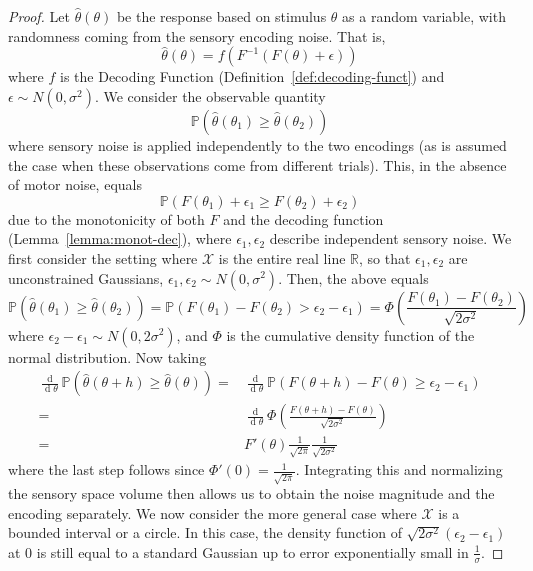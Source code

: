 \begin{proof}
    Let $\widehat{\theta}(\theta)$ be the response based on stimulus $\theta$ as a random variable, with randomness coming from the sensory encoding noise.
    That is,
    \begin{equation}
        \widehat{\theta}(\theta) = f(F^{-1}(F(\theta) + \epsilon))
    \end{equation}
    where $f$ is the Decoding Function (Definition~\ref{def:decoding-funct}) and $\epsilon \sim N(0,\sigma^2)$.
    We consider the observable quantity
\begin{equation}
\mathbb{P}\left(\widehat{\theta}(\theta_1) \geq \widehat{\theta}(\theta_2)\right)
\end{equation}
where sensory noise is applied independently to the two encodings (as is assumed the case when these observations come from different trials).
This, in the absence of motor noise, equals
\begin{equation}
\mathbb{P}\left(F(\theta_1) + \epsilon_1 \geq F(\theta_2) + \epsilon_2\right)
\end{equation}
due to the monotonicity of both $F$ and the decoding function (Lemma~\ref{lemma:monot-dec}), where $\epsilon_1, \epsilon_2$ describe independent sensory noise.
We first consider the setting where $\mathcal{X}$ is the entire real line $\mathbb{R}$, so that $\epsilon_1, \epsilon_2$ are unconstrained Gaussians, $\epsilon_1, \epsilon_2 \sim N(0,\sigma^2)$.
Then, the above equals
\begin{equation}\label{eq:comparison-encodings-cumulative}
\mathbb{P}\left(\widehat{\theta}(\theta_1) \geq \widehat{\theta}(\theta_2)\right) = \mathbb{P}\left(F(\theta_1) - F(\theta_2) > \epsilon_2-\epsilon_1\right) = \Phi\left(\frac{F(\theta_1) - F(\theta_2)}{\sqrt{2\sigma^2}}\right)
\end{equation}
where $\epsilon_2-\epsilon_1 \sim N(0,2\sigma^2)$, and $\Phi$ is the cumulative density function of the normal distribution. %
Now taking
\begin{align*}
 \frac{\operatorname{d}}{\operatorname{d}\theta}  \mathbb{P}(\widehat{\theta}(\theta+h) \geq \widehat{\theta}(\theta)) 
= & \frac{\operatorname{d}}{\operatorname{d}\theta}  \mathbb{P}(F(\theta+h) - F(\theta) \geq \epsilon_2-\epsilon_1) \\
    =&  \frac{\operatorname{d}}{\operatorname{d}\theta}  \Phi\left(\frac{F(\theta+h) - F(\theta)}{\sqrt{2\sigma^2}}\right) \\
    = & F'(\theta) \frac{1}{\sqrt{2\pi}} \frac{1}{\sqrt{2\sigma^2}}
\end{align*}
where the last step follows since $\Phi'(0) = \frac{1}{\sqrt{2\pi}}$.
Integrating this and normalizing the sensory space volume then allows us to obtain the noise magnitude and the encoding separately.
We now consider the more general case where $\mathcal{X}$ is a bounded interval or a circle. In this case, the density function of $\sqrt{2\sigma^2}\left(\epsilon_2-\epsilon_1\right)$ at 0 is still equal to a standard Gaussian up to error exponentially small in $\frac{1}{\sigma}$.
\end{proof}

